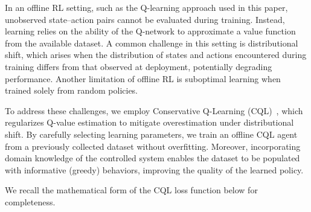 
In an offline RL setting, such as the Q-learning approach used in this paper, unobserved state–action pairs cannot be evaluated during training. Instead, learning relies on the ability of the Q-network to approximate a value function from the available dataset. A common challenge in this setting is distributional shift, which arises when the distribution of states and actions encountered during training differs from that observed at deployment, potentially degrading performance. Another limitation of offline RL is suboptimal learning when trained solely from random policies.

To address these challenges, we employ Conservative Q-Learning (CQL)~\cite{levine2020offline}, which regularizes Q-value estimation to mitigate overestimation under distributional shift. By carefully selecting learning parameters, we train an offline CQL agent from a previously collected dataset without overfitting. Moreover, incorporating domain knowledge of the controlled system enables the dataset to be populated with informative (greedy) behaviors, improving the quality of the learned policy. 

\iffalse 
We recall the mathematical form of the CQL loss function below for completeness.


